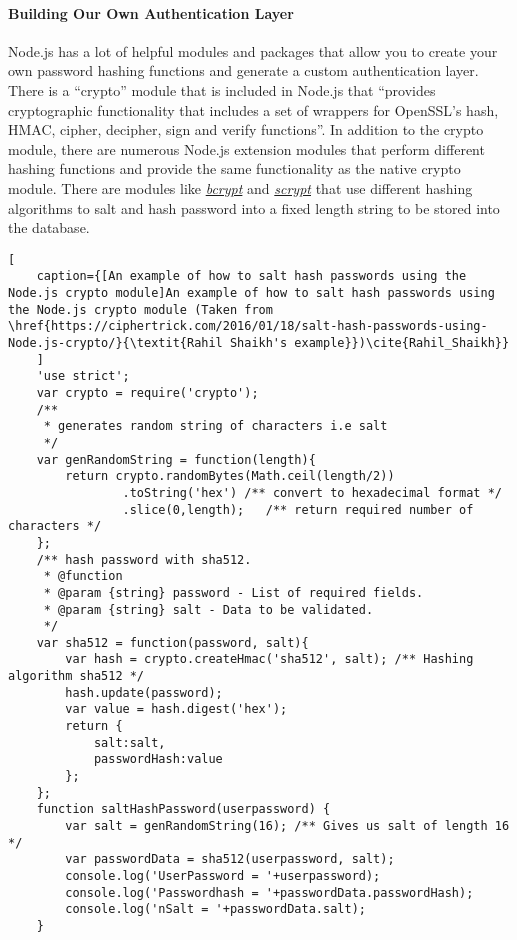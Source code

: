 \paragraph{Building Our Own Authentication Layer}
Node.js has a lot of helpful modules and packages that allow you to create your own password hashing functions and generate a custom authentication layer. There is a ``crypto'' module that is included in Node.js that ``provides cryptographic functionality that includes a set of wrappers for OpenSSL's hash, HMAC, cipher, decipher, sign and verify functions''\cite{Crypto}. In addition to the crypto module, there are numerous Node.js extension modules that perform different hashing functions and provide the same functionality as the native crypto module. There are modules like \href{https://www.npmjs.com/package/bcrypt-Node.js}{\textit{bcrypt}} and \href{https://www.npmjs.com/package/scrypt}{\textit{scrypt}} that use different hashing algorithms to salt and hash password into a fixed length string to be stored into the database.
\begin{lstlisting}[
    caption={[An example of how to salt hash passwords using the Node.js crypto module]An example of how to salt hash passwords using the Node.js crypto module (Taken from \href{https://ciphertrick.com/2016/01/18/salt-hash-passwords-using-Node.js-crypto/}{\textit{Rahil Shaikh's example}})\cite{Rahil_Shaikh}}
    ]
    'use strict';
    var crypto = require('crypto');
    /**
     * generates random string of characters i.e salt
     */
    var genRandomString = function(length){
        return crypto.randomBytes(Math.ceil(length/2))
                .toString('hex') /** convert to hexadecimal format */
                .slice(0,length);   /** return required number of characters */
    };
    /** hash password with sha512.
     * @function
     * @param {string} password - List of required fields.
     * @param {string} salt - Data to be validated.
     */
    var sha512 = function(password, salt){
        var hash = crypto.createHmac('sha512', salt); /** Hashing algorithm sha512 */
        hash.update(password);
        var value = hash.digest('hex');
        return {
            salt:salt,
            passwordHash:value
        };
    };
    function saltHashPassword(userpassword) {
        var salt = genRandomString(16); /** Gives us salt of length 16 */
        var passwordData = sha512(userpassword, salt);
        console.log('UserPassword = '+userpassword);
        console.log('Passwordhash = '+passwordData.passwordHash);
        console.log('nSalt = '+passwordData.salt);
    }
\end{lstlisting}
